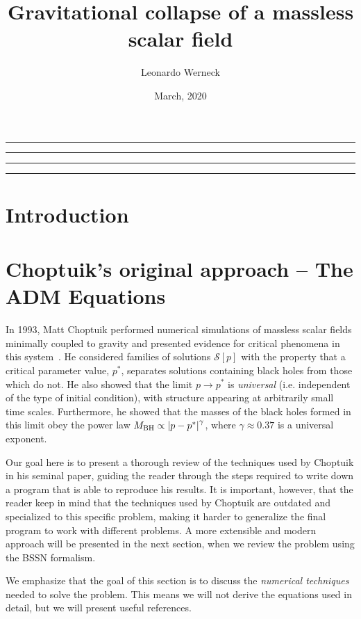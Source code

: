 \documentclass[a4paper,11pt]{article}
\title{Gravitational collapse of a massless scalar field}
\author{Leonardo Werneck}
\date{March, 2020}
\newcommand{\g}{\gamma}
\renewcommand{\S}{\mathcal{S}}
\newcommand{\lrsquare}[1]{\left[ #1 \right]}
\newcommand{\abs}[1]{\left| #1 \right|}
\newcommand{\ctr}[1]{
  \begin{center}
    #1
  \end{center}
}
\begin{document}
\maketitle

\ctr{\rule{\textwidth}{1pt}}
\tableofcontents
\ctr{\rule{\textwidth}{1pt}}
\listoffigures
\ctr{\rule{\textwidth}{1pt}}
\listoftables
\ctr{\rule{\textwidth}{1pt}}


\section{Introduction}

\section{Choptuik's original approach -- The ADM Equations}

In 1993, Matt Choptuik performed numerical simulations of massless scalar fields minimally coupled to gravity and presented evidence for critical phenomena in this system~\cite{PhysRevLett.70.9}. He considered families of solutions $\S\lrsquare{p}$ with the property that a critical parameter value, $p^{*}$, separates solutions containing black holes from those which do not. He also showed that the limit $p\to p^{*}$ is \emph{universal} (i.e. independent of the type of initial condition), with structure appearing at arbitrarily small time scales. Furthermore, he showed that the masses of the black holes formed in this limit obey the power law $M_{\rm BH} \propto \abs{p-p^{*}}^{\g}$, where $\g\approx0.37$ is a universal exponent.

Our goal here is to present a thorough review of the techniques used by Choptuik in his seminal paper, guiding the reader through the steps required to write down a program that is able to reproduce his results. It is important, however, that the reader keep in mind that the techniques used by Choptuik are outdated and specialized to this specific problem, making it harder to generalize the final program to work with different problems. A more extensible and modern approach will be presented in the next section, when we review the problem using the BSSN formalism.

We emphasize that the goal of this section is to discuss the \emph{numerical techniques} needed to solve the problem. This means we will not derive the equations used in detail, but we will present useful references.
\end{document}
